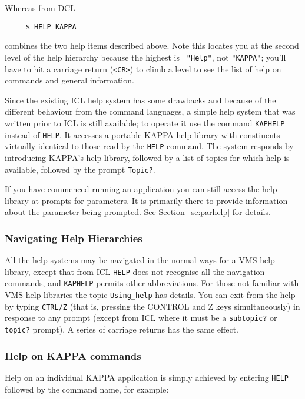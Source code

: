 Whereas from {\small DCL}

\small
\begin{verbatim}
     $ HELP KAPPA
\end{verbatim}
\normalsize
combines the two help items described above.  Note this locates you at
the second level of the help hierarchy because the highest is {\tt
"Help"}, not {\tt "KAPPA"}; you'll have to hit a carriage return
({\tt <CR>}) to climb a level to see the list of help on commands and
general information.

Since the existing {\small ICL} help system has some drawbacks and
because of the different behaviour from the command languages, a simple
help system that was written prior to {\small ICL} is still available;
to operate it use the command {\tt KAPHELP} instead of {\tt HELP}.  It
accesses a portable {\small KAPPA} help library with constiuents
virtually identical to those read by the {\tt HELP} command.
The system responds by introducing {\small KAPPA}'s help library,
followed by a list of topics for which help is available, followed by
the prompt {\tt Topic?}. 

 If you have commenced running an application you can still access the
help library at prompts for parameters.  It is primarily there to
provide information about the parameter being prompted. See
Section~\ref{se:parhelp} for details.

\subsubsection{Navigating Help Hierarchies} All the help systems may be
navigated in the normal ways for a VMS help library, except that from
{\small ICL} {\tt HELP} does not recognise all the navigation commands,
and {\tt KAPHELP} permits other abbreviations. For those not familiar
with VMS help libraries the topic {\tt Using\_help} has details. You can
exit from the help by typing {\tt CTRL/Z} (that is, pressing the CONTROL
and Z keys simultaneously) in response to any prompt (except from
{\small ICL} where it must be a {\tt subtopic?} or {\tt topic?} prompt).
 A series of carriage returns has the same effect. 

\subsubsection{Help on KAPPA commands}
Help on an individual {\small KAPPA} application is simply achieved by
entering {\tt HELP} followed by the command name, for example:

